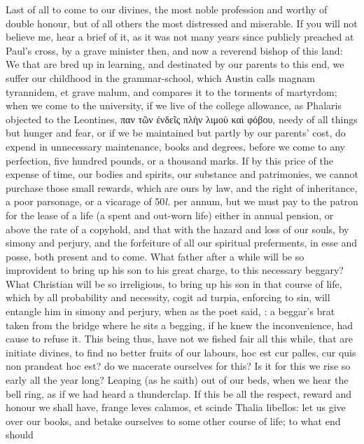 {Last of all to come to our divines, the most noble profession and
worthy of double honour, but of all others the most distressed and
miserable. If you will not believe me, hear a brief of it, as it was
not many years since publicly preached at Paul's cross, by a
grave minister then, and now a reverend bishop of this land: We that
are bred up in learning, and destinated by our parents to this end, we
suffer our childhood in the grammar-school, which Austin calls magnam
tyrannidem, et grave malum, and compares it to the torments of
martyrdom; when we come to the university, if we live of the college
allowance, as Phalaris objected to the Leontines, \textgreek{παν τῶν ἐνδεῖς πλὴν
λιμοὺ καὶ φόβου}, needy of all things but hunger and fear, or if we be
maintained but partly by our parents' cost, do expend in unnecessary
maintenance, books and degrees, before we come to any perfection, five
hundred pounds, or a thousand marks. If by this price of the expense of
time, our bodies and spirits, our substance and patrimonies, we cannot
purchase those small rewards, which are ours by law, and the right of
inheritance, a poor parsonage, or a vicarage of 50\emph{l.} per annum, but
we must pay to the patron for the lease of a life (a spent and out-worn
life) either in annual pension, or above the rate of a copyhold, and
that with the hazard and loss of our souls, by simony and perjury, and
the forfeiture of all our spiritual preferments, in esse and posse,
both present and to come. What father after a while will be so
improvident to bring up his son to his great charge, to this necessary
beggary? What Christian will be so irreligious, to bring up his son in
that course of life, which by all probability and necessity, cogit ad
turpia, enforcing to sin, will entangle him in simony and perjury, when
as the poet said, : a
beggar's brat taken from the bridge where he sits a begging, if he knew
the inconvenience, had cause to refuse it. This being thus, have not we
fished fair all this while, that are initiate divines, to find no
better fruits of our labours,  hoc est cur palles, cur quis non
prandeat hoc est? do we macerate ourselves for this? Is it for this we
rise so early all the year long? Leaping (as he saith) out of our
beds, when we hear the bell ring, as if we had heard a thunderclap. If
this be all the respect, reward and honour we shall have, frange
leves calamos, et scinde Thalia libellos: let us give over our books,
and betake ourselves to some other course of life; to what end should
}
